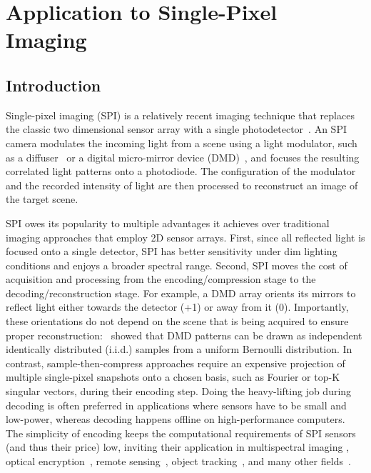 \section{Application to Single-Pixel Imaging}
\label{ch:cs}
\subsection{Introduction}
Single-pixel imaging (SPI) is a relatively recent imaging technique that replaces the classic two dimensional sensor array with a single photodetector~\citep{bian2018experimental}. An SPI camera modulates the incoming light from a scene using a light modulator, such as a diffuser~\citep{guo2016multilayer} or a digital micro-mirror device (DMD)~\citep{pittman1995optical, sampsell1993overview}, and focuses the resulting correlated light patterns onto a photodiode. The configuration of the modulator and the recorded intensity of light are then processed to reconstruct an image of the target scene.

SPI owes its popularity to multiple advantages it achieves over traditional imaging approaches that employ 2D sensor arrays. First, since all reflected light is focused onto a single detector, SPI has better sensitivity under dim lighting conditions and enjoys a broader spectral range\citep{Edgar2019}. Second, SPI moves the cost of acquisition and processing from the encoding/compression stage to the decoding/reconstruction stage. For example, a DMD array orients its mirrors to reflect light either towards the detector (+1) or away from it (0). Importantly, these orientations do not depend on the scene that is being acquired to ensure proper reconstruction: \citep{baraniuk2008simple}~showed that DMD patterns can be drawn as independent identically distributed (i.i.d.) samples from a uniform Bernoulli distribution. In contrast, sample-then-compress approaches\citep{skodras2001jpeg} require an expensive projection of multiple single-pixel snapshots onto a chosen basis, such as Fourier or top-K singular vectors, during their encoding step. Doing the heavy-lifting job during decoding is often preferred in applications where sensors have to be small and low-power, whereas decoding happens offline on high-performance computers. The simplicity of encoding keeps the computational requirements of SPI sensors (and thus their price) low, inviting their application in multispectral imaging \citep{bian2016multispectral,li2017efficient}, optical encryption~\citep{chen2013ghost}, remote sensing~\citep{zhao2012ghost}, object tracking~\citep{li2014ghost}, and many other fields~\citep{sun20133d,zhang2010correlated,cheng2009ghost}.

